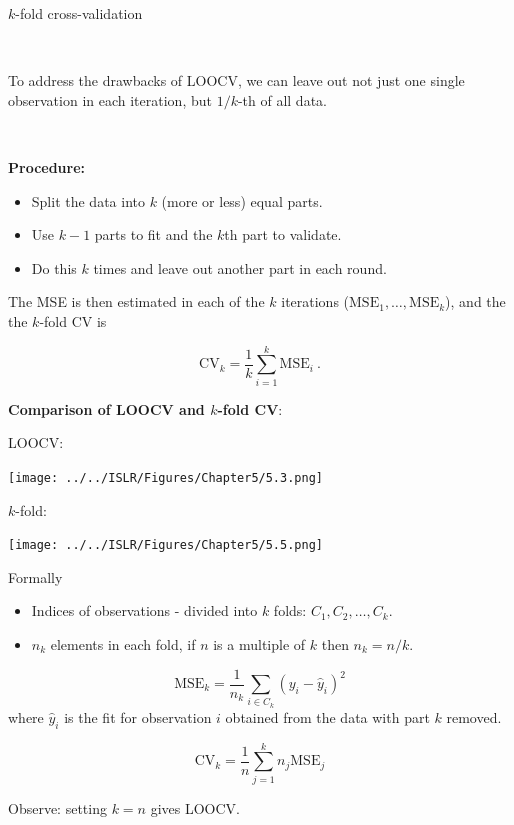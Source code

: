 \documentclass[10pt,ignorenonframetext,]{beamer}
\providecommand{\tightlist}{%
  \setlength{\itemsep}{0pt}\setlength{\parskip}{0pt}}
\begin{document}
\begin{frame}

\begin{block}{\(k\)-fold cross-validation}

\(~\)

To address the drawbacks of LOOCV, we can leave out not just one single
observation in each iteration, but \(1/k\)-th of all data.

\(~\)

\textbf{Procedure:}

\begin{itemize}
\tightlist
\item
  Split the data into \(k\) (more or less) equal parts.
\item
  Use \(k-1\) parts to fit and the \(k\)th part to validate.
\item
  Do this \(k\) times and leave out another part in each round.
\end{itemize}

The MSE is then estimated in each of the \(k\) iterations
(\(\text{MSE}_1,\ldots,\text{MSE}_k\)), and the the \(k\)-fold CV is

\[\text{CV}_k = \frac1k \sum_{i=1}^k \text{MSE}_i \ .\]

\end{block}

\end{frame}

\begin{frame}

\textbf{Comparison of LOOCV and \(k\)-fold CV}:

\centering
LOOCV:

\texttt{[image: ../../ISLR/Figures/Chapter5/5.3.png]}

\(k\)-fold:

\texttt{[image: ../../ISLR/Figures/Chapter5/5.5.png]}

\end{frame}

\begin{frame}

\begin{block}{Formally}

\begin{itemize}
\tightlist
\item
  Indices of observations - divided into \(k\) folds:
  \(C_1, C_2, \ldots, C_k\).
\item
  \(n_k\) elements in each fold, if \(n\) is a multiple of \(k\) then
  \(n_k=n/k\).
\end{itemize}

\[\text{MSE}_k=\frac{1}{n_k}\sum_{i\in C_k}(y_i-\hat{y}_i)^2\] where
\(\hat{y}_i\) is the fit for observation \(i\) obtained from the data
with part \(k\) removed.

\[\text{CV}_{k}=\frac{1}{n} \sum_{j=1}^k n_j \text{MSE}_j\]

Observe: setting \(k=n\) gives LOOCV.

\end{block}

\end{frame}
\end{document}
